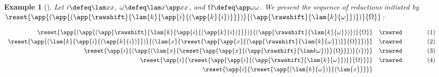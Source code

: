 \documentclass{lmcs}
\theoremstyle{defC}
\newtheorem{exaC}[thm]{Example}
\begin{document}
\begin{exaC}[\cite{Biernacki-al:HAL15}]%
  \label{e:reduction}
  Let $i \defeq \lam x x$, $\omega \defeq \lam x {\app x x}$, and $\Omega \defeq \app
  \omega \omega$. We present the sequence of reductions initiated by
  $\reset {\app {(\app {(\app {\rawshift}
        {\lam{k}{\app{i}{(\app{k}{i})}}})} {(\app {\rawshift}
        {\lam{k}{\omega}})})} {\Omega}}$:

  \[
     \begin{array}{rcl}
       \reset
           {\app
             {(\app
               {(\app
                 {\rawshift}
                 {\lam{k}{\app{i}{(\app{k}{i})}}})}
               {(\app
                 {\rawshift}
                 {\lam{k}{\omega}})})}
             {\Omega}} & \rawred & \quad\quad\quad (1)
           \\[1mm]
           \reset
               {\app
                 {(\lam{k}{\app{i}{(\app{k}{i})}})}
                 {(\lam{x}
                   {\reset
                     {\app
                       {\app
                         {x}
                         {(\app
                           {\rawshift}
                           {\lam{k}{\omega}})}}
                       {\Omega}}})}} & \rawred & \quad\quad\quad (2)
               \\[1mm]
               \reset
                   {\app
                     {i}
                     {(\app
                       {(\lam{x}
                         {\reset
                           {\app
                             {\app
                               {x}
                               {(\app
                                 {\rawshift}
                                 {\lam{k}{\omega}})}}
                             {\Omega}}})}
                       {i})}} & \rawred & \quad\quad\quad (3)
                   \\[1mm]
               \reset
                   {\app
                     {i}
                     {\reset
                        {\app
                          {\app
                            {i}
                            {(\app
                              {\rawshift}
                              {\lam{k}{\omega}})}}
                          {\Omega}}}} & \rawred & \quad\quad\quad (4)
                   \\[1mm]
               \reset
                   {\app
                     {i}
                     {\reset
                       {\app
                         {(\lam{k}{\omega})}
                         {(\lam{x}
}}}}
\end{array}\]
\end{exaC}
\end{document}
